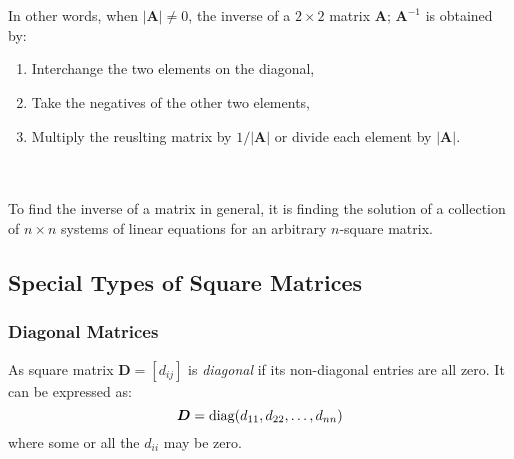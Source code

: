 \documentclass[../setup.tex]{subfiles}
\newcommand{\diag}[1]{\operatorname{diag}\mleft(#1\mright)}
\begin{document}
\phantom \\ \\
In other words, when $|\bm{A}| \neq 0$, the inverse of a $2 \times 2$ matrix $\bm{A}$; $\bm{A}^{-1}$ is obtained by:
\begin{center}
\begin{enumerate}
	\item Interchange the two elements on the diagonal,
	\item Take the negatives of the other two elements,
	\item Multiply the reuslting matrix by $1/|\bm{A}|$ or divide each element by $|\bm{A}|$.
\end{enumerate}
\end{center}
\phantom \\ \\
To find the inverse of a matrix in general, it is finding the solution of a collection of $n \times n$ systems of linear equations for an arbitrary $n$-square matrix. \\


\subsection{Special Types of Square Matrices}
\subsubsection{Diagonal Matrices}
As square matrix $\bm{D} = [d_{ij}]$ is \textit{diagonal} if its non-diagonal entries are all zero. It can be expressed as:
\[\bm{D} = \diag{d_{11}, d_{22}, \dots, d_{nn}}\]
where some or all the $d_{ii}$ may be zero.
\end{document}
